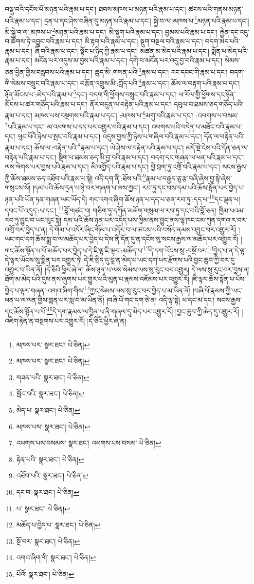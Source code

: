 བསྡུ་བའི་དངོས་པོ་མཉན་པའི་རྣམ་པ་དང་། ཐབས་མཁས་པ་མཉན་པའི་རྣམ་པ་དང་། ཚངས་པའི་གནས་མཉན་པའི་རྣམ་པ་དང་། དྲན་པ་དང་ཤེས་བཞིན་དུ་མཉན་པའི་རྣམ་པ་དང་། སྐྱེ་བ་ལ་:མཁས་པ་\footnote{མཁས་པར་  སྣར་ཐང་།  པེ་ཅིན། }མཉན་པའི་རྣམ་པ་དང་། མི་སྐྱེ་བ་ལ་:མཁས་པ་\footnote{མཁས་པར་  སྣར་ཐང་།  པེ་ཅིན། }མཉན་པའི་རྣམ་པ་དང་། མི་སྡུག་པའི་རྣམ་པ་དང་། བྱམས་པའི་རྣམ་པ་དང་། རྐྱེན་དང་འདུ་བ་ཚོགས་ཏེ་འབྱུང་བའི་རྣམ་པ་དང་། མི་རྟག་པའི་རྣམ་པ་དང་། སྡུག་བསྔལ་བའི་རྣམ་པ་དང་། བདག་མེད་པའི་རྣམ་པ་དང་། ཞི་བའི་རྣམ་པ་དང་། སྟོང་པ་ཉིད་ཀྱི་རྣམ་པ་དང་། མཚན་མ་མེད་པའི་རྣམ་པ་དང་། སྨོན་པ་མེད་པའི་རྣམ་པ་དང་། མངོན་པར་འདུས་མ་བྱས་པའི་རྣམ་པ་དང་། དགེ་བ་མངོན་པར་འདུ་བྱ་བའི་རྣམ་པ་དང་། སེམས་ཅན་བྱིན་གྱིས་བརླབས་པའི་རྣམ་པ་དང་། ཆུད་མི་:གསན་པའི་\footnote{གཟན་པའི་  སྣར་ཐང་།  པེ་ཅིན། }རྣམ་པ་དང་། རང་དབང་གི་རྣམ་པ་དང་། བདག་གི་སེམས་བསྲུང་བའི་རྣམ་པ་དང་། བརྩོན་འགྲུས་མི་:ཀློད་པའི་\footnote{གློང་བའི་  སྣར་ཐང་།  པེ་ཅིན། }རྣམ་པ་དང་། ཆོས་ལ་བརྟག་པའི་རྣམ་པ་དང་། ཉོན་མོངས་པ་:མེད་པའི་རྣམ་པ་\footnote{མེད་པ་  སྣར་ཐང་།  པེ་ཅིན། }དང་། བདག་གི་ཕྱོགས་བསྲུང་བའི་རྣམ་པ་དང་། ཕ་རོལ་གྱི་ཕྱོགས་དང་ཉོན་མོངས་པ་ཚར་གཅོད་པའི་རྣམ་པ་དང་། ནོར་བདུན་ལ་བརྟེན་པའི་རྣམ་པ་དང་། དབུལ་བ་ཐམས་ཅད་གཅོད་པའི་རྣམ་པ་དང་། མཁས་པས་བསྔགས་པའི་རྣམ་པ་དང་། :མཁས་པ་\footnote{མཁས་པས་  སྣར་ཐང་།  པེ་ཅིན། }མགུ་བའི་རྣམ་པ་དང་། :འཕགས་པ་བསམ་\footnote{འཕགས་པས་བསམས་  སྣར་ཐང་། འཕགས་པས་བསམ་  པེ་ཅིན། }པའི་རྣམ་པ་དང་། མ་འཕགས་པ་དད་པར་འགྱུར་བའི་རྣམ་པ་དང་། འཕགས་པའི་བདེན་པ་མཐོང་བའི་རྣམ་པ་དང་། ཕུང་པོའི་ཉེས་པ་སྤང་བའི་རྣམ་པ་དང་། འདུས་བྱས་ཀྱི་ཉེས་པ་གཞིལ་བའི་རྣམ་པ་དང་། དོན་ལ་བརྟེན་པའི་རྣམ་པ་དང་། ཆོས་ལ་:བརྟེན་པའི་\footnote{རྟེན་པའི་  སྣར་ཐང་།  པེ་ཅིན། }རྣམ་པ་དང་། ཡེ་ཤེས་ལ་བརྟེན་པའི་རྣམ་པ་དང་། མདོ་སྡེ་ངེས་པའི་དོན་ཅན་ལ་བརྟེན་པའི་རྣམ་པ་དང་། སྡིག་པ་ཐམས་ཅད་མི་བྱ་བའི་རྣམ་པ་དང་། བདག་དང་གཞན་ལ་ཕན་པའི་རྣམ་པ་དང་། ལས་ལེགས་པར་བྱས་པའི་རྣམ་པ་དང་། མི་འགྱོད་པའི་རྣམ་པ་དང་། བྱེ་བྲག་ཏུ་འགྲོ་བའི་རྣམ་པ་དང་། སངས་རྒྱས་ཀྱི་ཆོས་ཐམས་ཅད་འཐོབ་པའི་རྣམ་པ་སྟེ། འདི་དག་ནི་:ཐོས་པའི་\footnote{འཐོབ་པའི་  སྣར་ཐང་།  པེ་ཅིན། }རྣམ་པ་བརྒྱད་ཅུ་རྩ་བཞི་ཞེས་བྱ་སྟེ་ཞེས་གསུངས་སོ། །དམ་པའི་ཆོས་དྲན་པ་ཉེ་བར་གཞག་པ་ལས་ཀྱང་། རབ་ཏུ་དང་བས་དམ་པའི་ཆོས་སྟོན་པར་བྱེད་པ་ཉན་པའི་ཡོན་ཏན་གཞན་ཡང་ཡོད་དེ། གང་འགའ་ཞིག་ཆོས་ཉན་པ་དད་པ་ཅན་རབ་ཏུ་:དད་པ་\footnote{དང་བ་  སྣར་ཐང་།  པེ་ཅིན། }དང་ལྡན་པ། དབང་པོ་འདུད་:པ་དང་། \footnote{པ་  སྣར་ཐང་།  པེ་ཅིན། }བློ་གཙང་བ། གཅིག་ཏུ་དཀོན་མཆོག་གསུམ་ལ་རབ་ཏུ་དང་བའི་བློ་ཅན། ཁྱིམ་པའམ་རབ་ཏུ་བྱུང་བ་ཡང་རུང་སྟེ། དམ་པའི་ཆོས་ཉན་པར་འདོད་པས་ཁྱིམ་ནས་བྱུང་ནས་ལྷ་ཁང་ངམ་ཀུན་དགའ་ར་བར་འགྲོ་བར་བྱེད་པ་ན། དེ་གོམ་པ་འདོར་ཞིང་གོམ་པ་འདོར་བ་ལ་ཚངས་པའི་བསོད་ནམས་འབྱུང་བར་འགྱུར་རོ། །ཡང་གང་དག་ཆོས་སྨྲ་བ་ལ་མཆོད་པར་བྱེད་པ་དེས་ནི་དོན་དུ་ན་དངོས་སུ་སངས་རྒྱས་ལ་མཆོད་པར་འགྱུར་རོ། །གང་ཆོས་སྟོན་པ་པོ་མཆོད་པར་བྱེད་པ་དེ་ཇི་ལྟ་ཇི་ལྟར་:མཆོད་པ་\footnote{མཆོད་པ་བྱེད་པ་  སྣར་ཐང་།  པེ་ཅིན། }དེ་དག་ཡོངས་སུ་:བསྔོ་བར་\footnote{སྔོ་བར་  སྣར་ཐང་།  པེ་ཅིན། }བྱེད་པ་ན་དེ་ལྟ་དེ་ལྟར་ཡོངས་སུ་སྨིན་པར་འགྱུར་ཏེ། དེ་ཇི་སྲིད་དུ་བླ་ན་མེད་པ་ཡང་དག་པར་རྫོགས་པའི་བྱང་ཆུབ་ཀྱི་བར་དུ་འགྱུར་བ་ཡིན་ནོ། །དེ་ཅིའི་ཕྱིར་ཞེ་ན། ཆོས་ཉན་པ་ལས་སེམས་ལས་སུ་རུང་བར་འགྱུར། དེ་ལས་སུ་རུང་བར་བྱས་ན། ཐོག་མ་མེད་པའི་དུས་ནས་ཞུགས་པར་གྱུར་པའི་མུན་པ་རྣམས་འཇོམས་པར་འགྱུར་རོ། །ཇི་ལྟར་ཆོས་སྟོན་པ་པོས་བྱེད་པ་ལྟར་གཞན་:འགའ་ཞིག་གིས་\footnote{འགའ་ཞིག་གི་  སྣར་ཐང་།  པེ་ཅིན། }ཀྱང་སེམས་ལས་སུ་རུང་བར་བྱེད་པ་མ་ཡིན་ནོ། །བཞི་པོ་རྣམས་ཀྱི་ཡང་ཕན་པ་ལ་ལན་གྱིས་གླན་པར་སླ་བ་མ་ཡིན་ནོ། །བཞི་པོ་གང་དག་ཅེ་ན། འདི་ལྟ་སྟེ། ཕ་དང་མ་དང་། སངས་རྒྱས་དང་ཆོས་སྟོན་པ་པོ་\footnote{པོའོ་  སྣར་ཐང་།  པེ་ཅིན། }དེ་དག་རྣམས་ལ་བྱིན་པ་ནི་གཞལ་དུ་མེད་པར་འགྱུར་རོ། །བྱང་ཆུབ་ཀྱི་ཆེད་དུ་འགྱུར་རོ། །འཇིག་རྟེན་ན་བསྔགས་པར་འགྱུར་རོ། །དེ་ཅིའི་ཕྱིར་ཞེ་ན། 